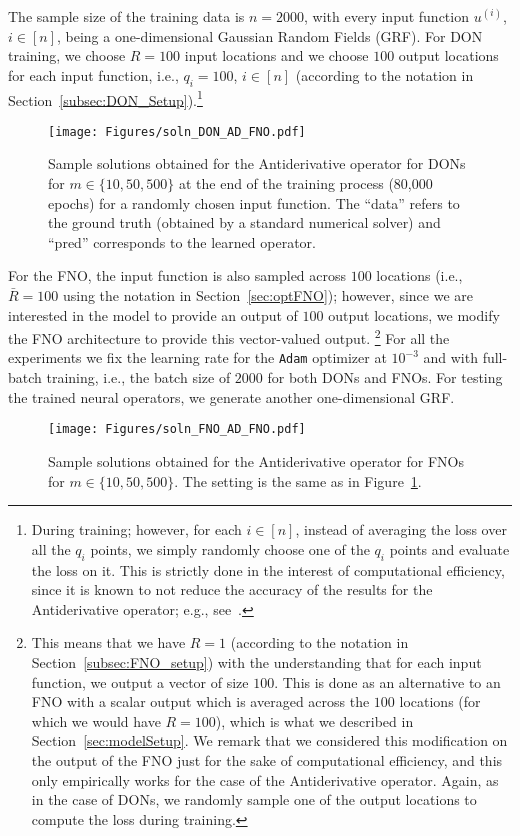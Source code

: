 The sample size of the training data is $n=2000$, with every input function $u^{(i)}$, $i\in[n]$, being a one-dimensional Gaussian Random Fields (GRF).
For DON training, we choose $R=100$ input locations and we choose $100$ output locations for each input function, i.e., $q_i=100$, $i\in[n]$ (according to the notation in Section~\ref{subsec:DON_Setup}).\footnote{During training; however, for each $i\in[n]$, instead of averaging the loss over all the $q_i$ points, we simply randomly choose one of the $q_i$ points and evaluate the loss on it. This is strictly done in the interest of computational efficiency, since it is known to not reduce the accuracy of the results for the Antiderivative operator; e.g.,  see~\citep{lu20201DeepONet}.}  
%
\begin{figure}[t!]
    \centering
    \texttt{[image: Figures/soln\_DON\_AD\_FNO.pdf]}
    \caption{Sample solutions obtained for the Antiderivative operator for DONs for $m\in \{10, 50, 500\}$ at the end of the training process (80,000 epochs) for a randomly chosen input function. The ``data'' refers to the ground truth (obtained by a standard numerical solver) and ``pred'' corresponds to the learned operator.}
    \label{fig:DON_solns_vs_width}
\end{figure}
%
For the FNO, the input function is also sampled across $100$ locations (i.e., $\bar{R}=100$ using the notation in Section~\ref{sec:optFNO}); however, since we are interested in the model to provide an output of $100$ output locations, we modify the FNO architecture to provide this vector-valued output.
\footnote{This means that we have $R=1$ (according to the notation in Section~\ref{subsec:FNO_setup}) with the understanding that for each input function, we output a vector of size $100$. This is done as an alternative to an FNO with a scalar output which is averaged across the $100$ locations (for which we would have $R=100$), which is what we described in Section~\ref{sec:modelSetup}. We remark that we considered this modification on the output of the FNO just for the sake of computational efficiency, and this only empirically works for the case of the Antiderivative operator. Again, as in the case of DONs, we randomly sample one of the output locations to compute the loss during training.} 
%
For all the experiments we fix the learning rate for the \texttt{Adam} optimizer at $10^{-3}$ and with full-batch training, i.e., the batch size of $2000$ for both DONs and FNOs. For testing the trained neural operators, we generate another one-dimensional GRF. 
%
\begin{figure}[t!]
    \centering
    \texttt{[image: Figures/soln\_FNO\_AD\_FNO.pdf]}
    \caption{Sample solutions obtained for the Antiderivative operator for FNOs for $m\in \{10, 50, 500\}$. The setting is the same as in Figure~\ref{fig:DON_solns_vs_width}.}
    \label{fig:FNO_solns_vs_width}
\end{figure}

